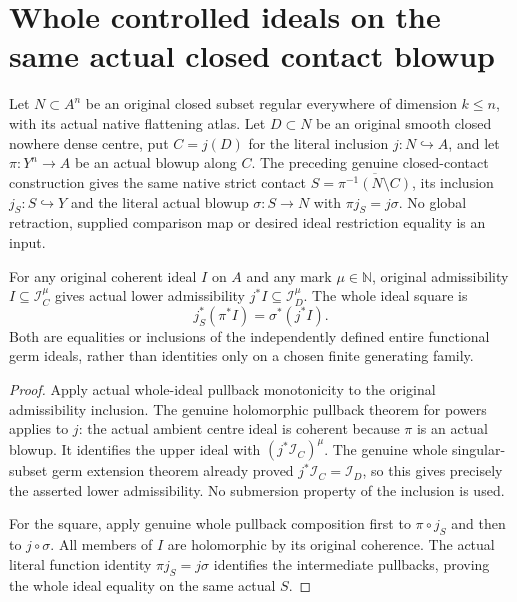 \section{Whole controlled ideals on the same actual closed contact blowup}

Let $N\subset A^n$ be an original closed subset regular everywhere of
dimension $k\le n$, with its actual native flattening atlas. Let
$D\subset N$ be an original smooth closed nowhere dense centre, put
$C=j(D)$ for the literal inclusion $j:N\hookrightarrow A$, and let
$\pi:Y^n\to A$ be an actual blowup along $C$. The preceding genuine
closed-contact construction gives the same native strict contact
$S=\overline{\pi^{-1}(N\setminus C)}$, its inclusion $j_S:S\hookrightarrow Y$
and the literal actual blowup $\sigma:S\to N$ with
$\pi j_S=j\sigma$. No global retraction, supplied comparison map or
desired ideal restriction equality is an input.

\begin{theorem}
\label{hir:actual-closed-contact-original-admissibility-total-square}
\leanok
For any original coherent ideal $I$ on $A$ and any mark $\mu\in\mathbb N$,
original admissibility $I\subseteq\mathcal I_C^\mu$ gives actual lower
admissibility $j^*I\subseteq\mathcal I_D^\mu$. The whole ideal square is
\[
 j_S^*(\pi^*I)=\sigma^*(j^*I).
\]
Both are equalities or inclusions of the independently defined entire
functional germ ideals, rather than identities only on a chosen finite
generating family.
\end{theorem}
\begin{proof}
Apply actual whole-ideal pullback monotonicity to the original
admissibility inclusion. The genuine holomorphic pullback theorem for
powers applies to $j$: the actual ambient centre ideal is coherent
because $\pi$ is an actual blowup. It identifies the upper ideal with
$(j^*\mathcal I_C)^\mu$. The genuine whole singular-subset germ
extension theorem already proved $j^*\mathcal I_C=\mathcal I_D$, so
this gives precisely the asserted lower admissibility. No submersion
property of the inclusion is used.

For the square, apply genuine whole pullback composition first to
$\pi\circ j_S$ and then to $j\circ\sigma$. All members of $I$ are
holomorphic by its original coherence. The actual literal function
identity $\pi j_S=j\sigma$ identifies the intermediate pullbacks,
proving the whole ideal equality on the same actual $S$.
\end{proof}

